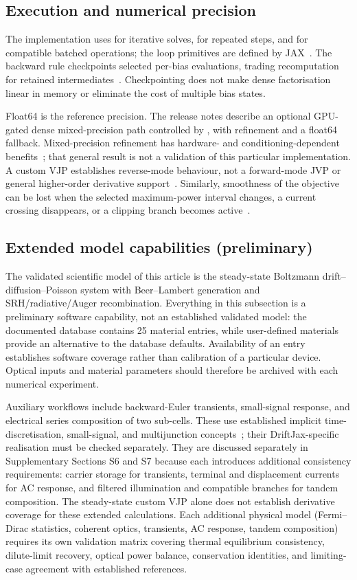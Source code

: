 \subsection{Execution and numerical precision}
The implementation uses  for iterative solves,
 for repeated steps, and  for compatible batched
operations; the loop primitives are defined by JAX~\cite{jaxlax}.
The backward rule checkpoints selected per-bias evaluations,
trading recomputation for retained intermediates~\cite{jaxcheckpoint}.
Checkpointing does not make dense factorisation linear in memory or
eliminate the cost of multiple bias states.

Float64 is the reference precision. The release notes describe an optional
GPU-gated dense mixed-precision path controlled by
, with refinement and a float64 fallback.
Mixed-precision refinement has hardware- and conditioning-dependent
benefits~\cite{carson2018}; that general result is not a validation of this
particular implementation. A custom VJP establishes
reverse-mode behaviour, not a forward-mode JVP or general higher-order
derivative support~\cite{jaxcustomvjp}. Similarly, smoothness of the
objective can be lost when the selected maximum-power interval changes,
a current crossing disappears, or a clipping branch becomes
active~\cite{jaxfaq}.

\subsection{Extended model capabilities (preliminary)}
The validated scientific model of this article is the steady-state
Boltzmann drift--diffusion--Poisson system with Beer--Lambert generation
and SRH/radiative/Auger recombination. Everything in this subsection is
a preliminary software capability, not an established validated model:
the documented database contains 25 material entries, while user-defined
materials provide an alternative to the database defaults. Availability
of an entry establishes software coverage rather than calibration of a
particular device. Optical inputs and material parameters should therefore
be archived with each numerical experiment.

Auxiliary workflows include backward-Euler transients, small-signal
response, and electrical series composition of two sub-cells. These use
established implicit time-discretisation, small-signal, and multijunction
concepts~\cite{sundialsida,laux1985,henry1980}; their DriftJax-specific
realisation must be checked separately. They are
discussed separately in Supplementary Sections S6 and S7 because each
introduces additional consistency requirements: carrier storage for
transients, terminal and displacement currents for AC response, and
filtered illumination and compatible branches for tandem composition.
The steady-state custom VJP alone does not establish derivative coverage
for these extended calculations. Each additional physical model
(Fermi--Dirac statistics, coherent optics, transients, AC response,
tandem composition) requires its own validation matrix covering thermal
equilibrium consistency, dilute-limit recovery, optical power balance,
conservation identities, and limiting-case agreement with established
references.

